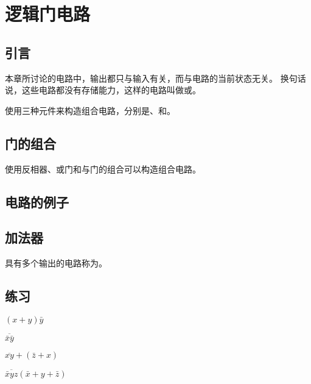 
\section{逻辑门电路}
{
    \subsection{引言}
    {
        本章所讨论的电路中，输出都只与输入有关，而与电路的当前状态无关。
        换句话说，这些电路都没有存储能力，这样的电路叫做或。

        使用三种元件来构造组合电路，分别是、和。
    }

    \subsection{门的组合}
    {
        使用反相器、或门和与门的组合可以构造组合电路。
    }

    \subsection{电路的例子}
    {

    }

    \subsection{加法器}
    {
        具有多个输出的电路称为。
    }

    \subsection{练习}
    {
        \begin{practices}
            $(x + y)\bar{y}$
        \end{practices}

        \begin{practices}
            $\overline{\bar{x}\bar{y}}$
        \end{practices}

        \begin{practices}
            $\overline{xy} + (\bar{z} + x)$
        \end{practices}

        \begin{practices}
            $\overline{\bar{x}yz}(\bar{x} + y + \bar{z})$
        \end{practices}

}}
